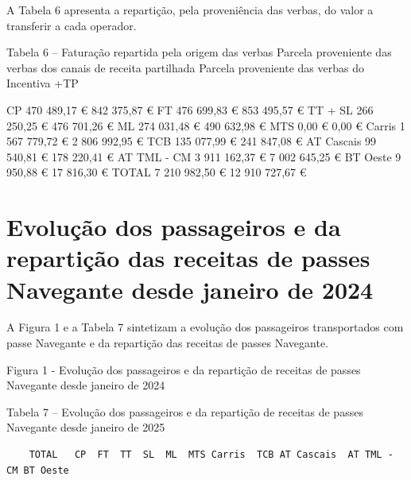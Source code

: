 \documentclass[
  a4paper,
]{article}
\begin{document}
A Tabela 6 apresenta a repartição, pela proveniência das verbas, do
valor a transferir a cada operador.

Tabela 6 -- Faturação repartida pela origem das verbas Parcela
proveniente das verbas dos canais de receita partilhada Parcela
proveniente das verbas do Incentiva +TP

CP 470 489,17 € 842 375,87 € FT 476 699,83 € 853 495,57 € TT + SL 266
250,25 € 476 701,26 € ML 274 031,48 € 490 632,98 € MTS 0,00 € 0,00 €
Carris 1 567 779,72 € 2 806 992,95 € TCB 135 077,99 € 241 847,08 € AT
Cascais 99 540,81 € 178 220,41 € AT TML - CM 3 911 162,37 € 7 002 645,25
€ BT Oeste 9 950,88 € 17 816,30 € TOTAL 7 210 982,50 € 12 910 727,67 €

\section{Evolução dos passageiros e da repartição das receitas de passes
Navegante desde janeiro de
2024}\label{evoluuxe7uxe3o-dos-passageiros-e-da-repartiuxe7uxe3o-das-receitas-de-passes-navegante-desde-janeiro-de-2024}

A Figura 1 e a Tabela 7 sintetizam a evolução dos passageiros
transportados com passe Navegante e da repartição das receitas de passes
Navegante.

Figura 1 - Evolução dos passageiros e da repartição de receitas de
passes Navegante desde janeiro de 2024

Tabela 7 -- Evolução dos passageiros e da repartição de receitas de
passes Navegante desde janeiro de 2025

\begin{verbatim}
    TOTAL   CP  FT  TT  SL  ML  MTS Carris  TCB AT Cascais  AT TML - CM BT Oeste
\end{verbatim}
\end{document}
